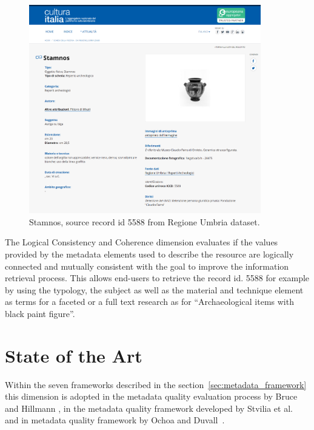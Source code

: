 \documentclass[epsfig,a4paper,12pt,titlepage]{book}
\begin{document}
	\begin{figure}[h]
		\center 
		\includegraphics[width=0.9\textwidth]{stamnos.png}
		\caption{Stamnos, source record id 5588 from Regione Umbria dataset.}
		\label{stamnos}       %
	\end{figure}

The Logical Consistency and Coherence dimension evaluates if the values provided by the metadata elements used to describe the resource are logically connected and mutually consistent with the goal to improve the information retrieval process. This allows end-users to retrieve the record id. 5588 for example by using the typology, the subject as well as the material and technique element as terms for a faceted or a full text research as for ``Archaeological items with black paint figure''.
\section{State of the Art}
 \label{coherence_sota}
Within the seven frameworks described in the section~\ref{sec:metadata_framework}
this dimension is adopted in the metadata quality evaluation process by Bruce and Hillmann \cite{1}, in the metadata quality framework developed by Stvilia et al.~\cite{20} and in metadata quality framework by Ochoa and Duvall~\cite{2}.
\end{document}
